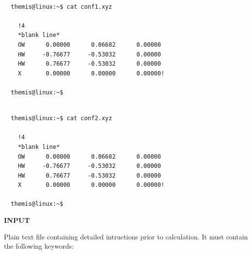 \documentclass[10pt,a4paper]{report}
\begin{document}
\begin{center}
  \begin{minipage}{0.45\textwidth}
    \begin{verbatim}

  themis@linux:~$ cat conf1.xyz 

    !4 
    *blank line*
    OW      0.00000      0.06682      0.00000
    HW     -0.76677     -0.53032      0.00000
    HW      0.76677     -0.53032      0.00000
    X       0.00000      0.00000      0.00000!

  themis@linux:~$ 

    \end{verbatim}
    \vskip0.5cm
  \end{minipage}%
%
  \hskip1.0cm
%
  \begin{minipage}{0.45\textwidth}
    \begin{verbatim}

  themis@linux:~$ cat conf2.xyz 

    !4 
    *blank line*
    OW      0.00000      0.06682      0.00000
    HW     -0.76677     -0.53032      0.00000
    HW      0.76677     -0.53032      0.00000
    X       0.00000      0.00000      0.00000!

  themis@linux:~$

    \end{verbatim}
    \vskip0.5cm
  \end{minipage}%
\end{center}


\newpage
\textbf{INPUT} 

Plain text file containing detailed intructions prior to calculation. It must contain the following keywords:
\end{document}

